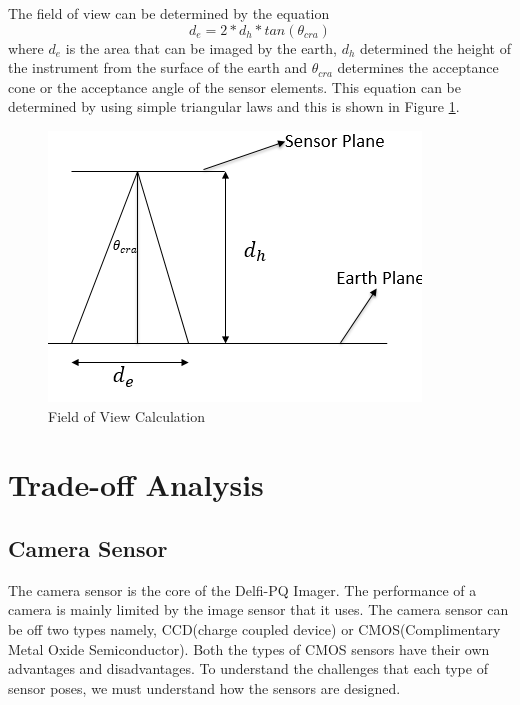 The field of view can be determined by the equation
\begin{equation}
\label{eq:fov_calc}
d_e = 2*d_h*tan(\theta_{cra})
\end{equation}
where $d_e$ is the area that can be imaged by the earth, $d_h$ determined the height of the instrument from the surface of the earth and $\theta_{cra}$ determines the acceptance cone or the acceptance angle of the sensor elements. This equation can be determined by using simple triangular laws and this is shown in Figure \ref{fig:fov_calc}.
\begin{figure}[htb]
\includegraphics[width=\textwidth]{pics/fov}
\caption{Field of View Calculation}
\label{fig:fov_calc}
\end{figure}

\section{Trade-off Analysis}
\label{sec:tradeOff}
\subsection{Camera Sensor}
The camera sensor is the core of the Delfi-PQ Imager. The performance of a camera is mainly limited by the image sensor that it uses\cite{cmos}. The camera sensor can be off two types namely, CCD(charge coupled device) or CMOS(Complimentary Metal Oxide Semiconductor). Both the types of CMOS sensors have their own advantages and disadvantages. To understand the challenges that each type of sensor poses, we must understand how the sensors are designed.

